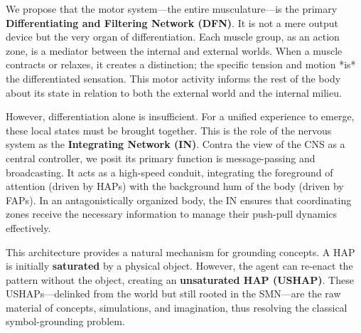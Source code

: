 We propose that the motor system—the entire musculature—is the primary \textbf{Differentiating and Filtering Network (DFN)}. It is not a mere output device but the very organ of differentiation. Each muscle group, as an action zone, is a mediator between the internal and external worlds. When a muscle contracts or relaxes, it creates a distinction; the specific tension and motion *is* the differentiated sensation. This motor activity informs the rest of the body about its state in relation to both the external world and the internal milieu.

However, differentiation alone is insufficient. For a unified experience to emerge, these local states must be brought together. This is the role of the nervous system as the \textbf{Integrating Network (IN)}. Contra the view of the CNS as a central controller, we posit its primary function is message-passing and broadcasting. It acts as a high-speed conduit, integrating the foreground of attention (driven by HAPs) with the background hum of the body (driven by FAPs). In an antagonistically organized body, the IN ensures that coordinating zones receive the necessary information to manage their push-pull dynamics effectively.

This architecture provides a natural mechanism for grounding concepts. A HAP is initially \textbf{saturated} by a physical object. However, the agent can re-enact the pattern without the object, creating an \textbf{unsaturated HAP (USHAP)}. These USHAPs—delinked from the world but still rooted in the SMN—are the raw material of concepts, simulations, and imagination, thus resolving the classical symbol-grounding problem.